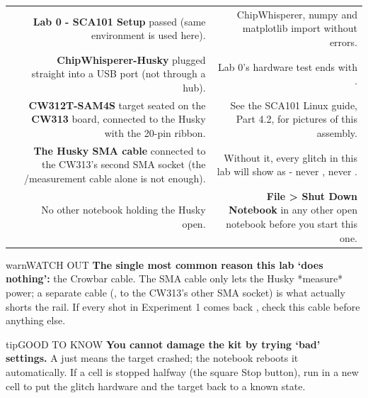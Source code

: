 \documentclass[11pt,letterpaper]{article}
\begin{document}
{\small{}
\begin{longtable}{|R{0.0652}|R{0.5217}|R{0.4130}|}
\hline
{}\hdrcell{} &  &  \\ \hline
\endhead
[  ] & \textbf{Lab 0 - SCA101 Setup} passed (same environment is used here). & ChipWhisperer, numpy and matplotlib import without errors. \\ \hline
[  ] & \textbf{ChipWhisperer-Husky} plugged straight into a USB port (not through a hub). & Lab 0's hardware test ends with . \\ \hline
[  ] & \textbf{CW312T-SAM4S} target seated on the \textbf{CW313} board, connected to the Husky with the 20-pin ribbon. & See the SCA101 Linux guide, Part 4.2, for pictures of this assembly. \\ \hline
[  ] & \textbf{The Husky  SMA cable} connected to the CW313's second SMA socket (the /measurement cable alone is not enough). & Without it, every glitch in this lab will show as  - never , never . \\ \hline
[  ] & No other notebook holding the Husky open. & \textbf{File \textgreater{} Shut Down Notebook} in any other open notebook before you start this one. \\ \hline
\end{longtable}}

\vspace{4pt}

\begin{guidecallout}{warn}{WATCH OUT}
\textbf{The single most common reason this lab `does nothing':} the Crowbar cable. The  SMA cable only lets
the Husky *measure* power; a separate cable (, to the CW313's other SMA socket) is what actually shorts
the rail. If every shot in Experiment 1 comes back , check this cable before anything else.
\end{guidecallout}

\begin{guidecallout}{tip}{GOOD TO KNOW}
\textbf{You cannot damage the kit by trying `bad' settings.} A  just means the target crashed; the
notebook reboots it automatically. If a cell is stopped halfway (the square Stop button), run  in a
new cell to put the glitch hardware and the target back to a known state.
\end{guidecallout}
\end{document}

